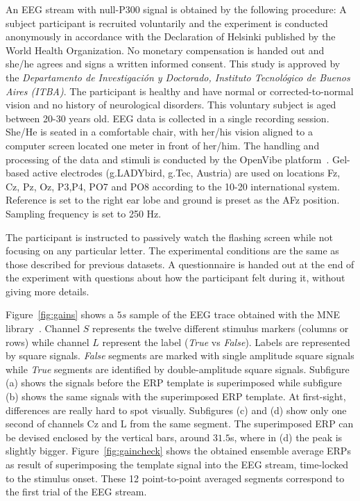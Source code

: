 An EEG stream with null-P300 signal is obtained by the following procedure: 
A subject participant is recruited voluntarily and the experiment is conducted anonymously in accordance with the Declaration of Helsinki published by the World Health Organization.  No monetary compensation is handed out and she/he agrees and signs a written informed consent.  This study is approved by the \textit{Departamento de Investigación y Doctorado, Instituto Tecnológico de Buenos Aires (ITBA)}.  The participant is healthy and have normal or corrected-to-normal vision and no history of neurological disorders. This voluntary subject is aged between 20-30 years old.  EEG data is collected in a single recording session. She/He is seated in a comfortable chair, with her/his vision aligned to a computer screen located one meter in front of her/him.  The handling and processing of the data and stimuli is conducted by the OpenVibe platform~\cite{Renard2010}.  Gel-based active electrodes (g.LADYbird, g.Tec, Austria) are used on locations Fz, Cz, Pz, Oz, P3,P4, PO7 and PO8 according to the 10-20 international system.  Reference is set to the right ear lobe and ground is preset as the AFz position.   Sampling frequency is set to 250 Hz.

The participant is instructed to passively watch the flashing screen while not focusing on any particular letter.  The experimental conditions are the same as those described for previous datasets.  A questionnaire is handed out at the end of the experiment with questions about how the participant felt during it, without giving more details.  


Figure~\ref{fig:gains} shows a $5s$ sample of the EEG trace obtained with the MNE library~\cite{Gramfort2013}.  Channel $S$ represents the twelve different stimulus markers (columns or rows) while channel $L$ represent the label (\textit{True} vs \textit{False}).  Labels are represented by square signals.  \textit{False} segments are marked with single amplitude square signals while \textit{True} segments are identified by double-amplitude square signals.  Subfigure (a) shows the signals before the ERP template is superimposed while subfigure (b) shows the same signals with the superimposed ERP template.  At first-sight, differences are really hard to spot visually.  Subfigures (c) and (d) show only one second of channels Cz and L from the same segment.  The superimposed ERP can be devised enclosed by the vertical bars, around $31.5$s, where in (d) the peak is slightly bigger.  Figure~\ref{fig:gaincheck} shows the obtained ensemble average ERPs as result of superimposing the template signal into the EEG stream, time-locked to the stimulus onset.   These 12 point-to-point averaged segments correspond to the first trial of the EEG stream.

